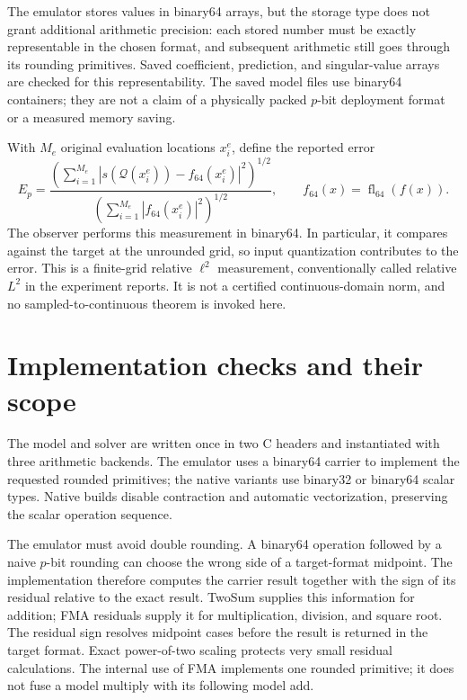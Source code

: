 \documentclass[11pt]{article}
\newcommand{\Q}{\mathcal Q}
\newcommand{\fl}{\operatorname{fl}}
\begin{document}
The emulator stores values in binary64 arrays, but the storage type does not
grant additional arithmetic precision: each stored number must be exactly
representable in the chosen format, and subsequent arithmetic still goes
through its rounding primitives. Saved coefficient, prediction, and
singular-value arrays are checked for this representability. The saved
model files use binary64 containers; they are not a claim of a physically
packed $p$-bit deployment format or a measured memory saving.

With $M_e$ original evaluation locations $x^e_i$, define the reported error
\[
 E_p=\frac{\left(\sum_{i=1}^{M_e}
   |s(\Q(x^e_i))-f_{64}(x^e_i)|^2\right)^{1/2}}
 {\left(\sum_{i=1}^{M_e}|f_{64}(x^e_i)|^2\right)^{1/2}},
 \qquad f_{64}(x)=\fl_{64}(f(x)).
\]
The observer performs this measurement in binary64. In particular, it compares
against the target at the unrounded grid, so input quantization contributes
to the error. This is a finite-grid relative $\ell^2$ measurement, conventionally
called relative $L^2$ in the experiment reports. It is not a certified
continuous-domain norm, and no sampled-to-continuous theorem is invoked here.

\section{Implementation checks and their scope}

The model and solver are written once in two C headers and instantiated with
three arithmetic backends. The emulator uses a binary64 carrier to implement
the requested rounded primitives; the native variants use binary32 or
binary64 scalar types. Native builds disable contraction and automatic
vectorization, preserving the scalar operation sequence.

The emulator must avoid double rounding. A binary64 operation followed by a
naive $p$-bit rounding can choose the wrong side of a target-format midpoint.
The implementation therefore computes the carrier result together with the
sign of its residual relative to the exact result. TwoSum supplies this
information for addition; FMA residuals supply it for multiplication, division,
and square root. The residual sign resolves midpoint cases before the result
is returned in the target format. Exact power-of-two scaling protects very
small residual calculations. The internal use of FMA implements one rounded
primitive; it does not fuse a model multiply with its following model add.
\end{document}
